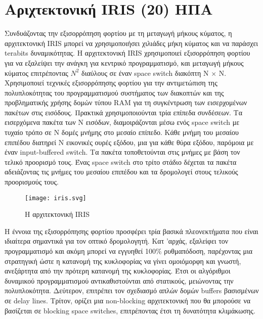 
\section{Αριχτεκτονική IRIS (20) ΗΠΑ}


Συνδυάζοντας την εξισορρόπηση φορτίου με τη μεταγωγή μήκους κύματος, η
αρχιτεκτονική IRIS μπορεί να χρησιμοποιήσει χιλιάδες μήκη κύματος και
να παράσχει terabits δυναμικότητας. Η αρχιτεκτονική IRIS χρησιμοποιεί
εξισορρόπηση φορτίου για να εξαλείψει την ανάγκη για κεντρικό
προγραμματισμό, και μεταγωγή μήκους κύματος επιτρέποντας $N^2$
διαύλους σε έναν space switch διακόπτη N × N. Xρησιμοποιεί τεχνικές
εξισορρόπησης φορτίου για την αντιμετώπιση της πολυπλοκότητας του
προγραμματισμού συστήματος των διακοπτών και της προβληματικής χρήσης
δομών τύπου RAM για τη συγκέντρωση των εισερχομένων πακέτων στις
εισόδους. Πρακτικά χρησιμοποιούνται τρία επίπεδα συνδέσεων. Τα
εισερχόμενα πακέτα των N εισόδων, διαμοιράζονται μέσω ενός space
switch με τυχαίο τρόπο σε Ν δομές μνήμης στο μεσαίο επίπεδο. Κάθε
μνήμη του μεσαίου επιπέδου διατηρεί Ν εικονικές ουρές εξόδου, μια για
κάθε θύρα εξόδου, παρόμοια με έναν input-buffered switch. Τα πακέτα
τοποθετούνται στις μνήμες με βάση τον τελικό προορισμό τους. Ένας
space switch στο τρίτο στάδιο δέχεται τα πακέτα αδειάζοντας τις μνήμες
του μεσαίου επιπέδου και τα δρομολογεί στους τελικούς προορισμούς
τους.

\begin{figure}[h]
  \centering
  \texttt{[image: iris.svg]}
  \caption{Η αρχιτεκτονική IRIS}
  \label{fig:iris}
\end{figure}

H έννοια της εξισορρόπησης φορτίου προσφέρει τρία βασικά πλεονεκτήματα
που είναι ιδιαίτερα σημαντικά για τον οπτικό δρομολογητή. Κατ 'αρχάς,
εξαλείφει τον προγραμματισμό και ακόμη μπορεί να εγγυηθεί 100\%
ρυθμαπόδοση, παρέχοντας μια στρατηγική ώστε η κατανομή της κυκλοφορίας
να γίνει ομοιόμορφη και γνωστή, ανεξάρτητα από την πρότερη κατανομή
της κυκλοφορίας. Έτσι οι αλγόριθμοι δυναμικού προγραμματισμού
αντικαθιστούνται από στατικούς, μειώνοντας την
πολυπλοκότητα. Δεύτερον, επιτρέπει τον σχεδιασμό απλών δομών buffers
βασισμένων σε delay lines. Τρίτον, ορίζει μια non-blocking
αρχιτεκτονική που θα μπορούσε να βασίζεται σε blocking space switches,
επιτρέποντας έτσι τη δυνατότητα κλιμάκωσης.

